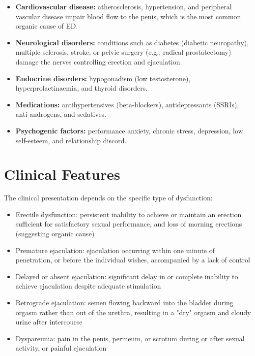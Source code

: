 \begin{itemize}
    \item \textbf{Cardiovascular disease:} atherosclerosis, hypertension, and peripheral vascular disease impair blood flow to the penis, which is the most common organic cause of ED.
    \item \textbf{Neurological disorders:} conditions such as diabetes (diabetic neuropathy), multiple sclerosis, stroke, or pelvic surgery (e.g., radical prostatectomy) damage the nerves controlling erection and ejaculation.
    \item \textbf{Endocrine disorders:} hypogonadism (low testosterone), hyperprolactinaemia, and thyroid disorders.
    \item \textbf{Medications:} antihypertensives (beta-blockers), antidepressants (SSRIs), anti-androgens, and sedatives.
    \item \textbf{Psychogenic factors:} performance anxiety, chronic stress, depression, low self-esteem, and relationship discord.
\end{itemize}

\section*{Clinical Features}
The clinical presentation depends on the specific type of dysfunction:

\begin{itemize}
    \item Erectile dysfunction: persistent inability to achieve or maintain an erection sufficient for satisfactory sexual performance, and loss of morning erections (suggesting organic cause)
    \item Premature ejaculation: ejaculation occurring within one minute of penetration, or before the individual wishes, accompanied by a lack of control
    \item Delayed or absent ejaculation: significant delay in or complete inability to achieve ejaculation despite adequate stimulation
    \item Retrograde ejaculation: semen flowing backward into the bladder during orgasm rather than out of the urethra, resulting in a "dry" orgasm and cloudy urine after intercourse
    \item Dyspareunia: pain in the penis, perineum, or scrotum during or after sexual activity, or painful ejaculation
\end{itemize}

